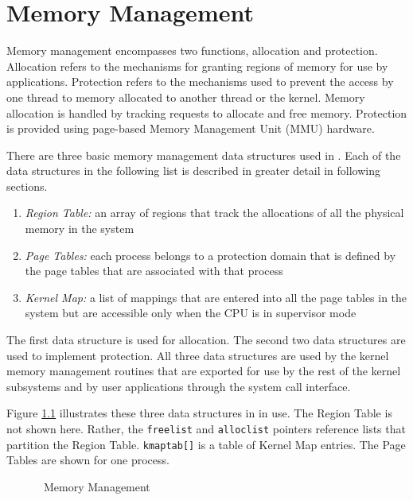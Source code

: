 \chapter{Memory Management}

Memory management encompasses two functions, allocation and
protection.  Allocation refers to the mechanisms for granting
regions of memory for use by applications.  Protection refers
to the mechanisms used to prevent the access by one thread to
memory allocated to another thread or the kernel.  Memory
allocation is handled by tracking requests to allocate and
free memory.  Protection is provided using page-based Memory
Management Unit (MMU) hardware.

There are three basic memory management data structures used
in \roadrunner.  Each of the data structures in the following
list is described in greater detail in following sections.

\begin{enumerate}
\item {\em Region Table:} an array of regions that track the
allocations of all the physical memory in the system

\item {\em Page Tables:} each process belongs to a protection
domain that is defined by the page tables that are associated
with that process

\item {\em Kernel Map:} a list of mappings that are entered
into all the page tables in the system but are accessible
only when the CPU is in supervisor mode
\end{enumerate}

\noindent The first data structure is used for allocation.
The second two data structures are used to implement protection.
All three data structures are used by the kernel memory
management routines that are exported for use by the rest
of the kernel subsystems and by user applications through
the system call interface.

Figure \ref{memmgmt} illustrates these three data structures
in in use.  The Region Table is not shown here.  Rather, the
{\tt freelist} and {\tt alloclist} pointers reference lists
that partition the Region Table.  {\tt kmaptab[]} is a table of
Kernel Map entries.  The Page Tables are shown for one process.

\begin{center}\begin{figure}[h]
\centerline{}
\caption{\label{memmgmt} \roadrunner\  Memory Management}
\end{figure}\end{center}



